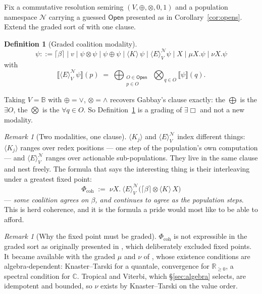 \documentclass[11pt,a4paper]{article}
\theoremstyle{plain}
\theoremstyle{definition}
\newtheorem{definition}[theorem]{Definition}
\theoremstyle{remark}
\newtheorem{remark}[theorem]{Remark}
\newcommand{\Open}{\mathsf{Open}}
\newcommand{\Ebox}{\exists\Box}
\newcommand{\gE}[2]{\langle E\rangle^{#1}_{#2}}
\newcommand{\gK}[1]{\langle K_{#1}\rangle}
\newcommand{\Nsp}{\mathcal{N}}
\newcommand{\Val}{V}
\newcommand{\sem}[1]{\llbracket #1 \rrbracket}
\begin{document}
Fix a commutative resolution semiring $(\Val,\oplus,\otimes,0,1)$ and a
population namespace $\Nsp$ carrying a guessed $\Open$ presented as in
Corollary~\ref{cor:opens}. Extend the graded sort of \cite{gradedwhere,choicef}
with one clause.

\begin{definition}[Graded coalition modality]\label{def:gE}
\[
\psi ::= \lceil\beta\rceil \mid v \mid \psi\otimes\psi \mid \psi\oplus\psi
      \mid \gK{}{}\,\psi \mid \gE{\Nsp}{\Val}\psi
      \mid X \mid \mu X.\psi \mid \nu X.\psi
\]
with
\[
\sem{\gE{\Nsp}{\Val}\psi}(p) \;=\;
\bigoplus_{\substack{O\in\Open\\ p\in O}}\ \bigotimes_{q\in O} \sem{\psi}(q).
\]
\end{definition}

Taking $\Val = \mathbb{B}$ with $\oplus = \vee$, $\otimes = \wedge$ recovers
Gabbay's clause exactly: the $\bigoplus$ is the $\exists O$, the $\bigotimes$
is the $\forall q\in O$. So Definition~\ref{def:gE} is a grading of $\Ebox$ and
not a new modality.

\begin{remark}[Two modalities, one clause]\label{rem:twomod}
$\gK{j}$ and $\gE{\Nsp}{\Val}$ index different things: $\gK{j}$ ranges over
redex positions --- one step of the population's own computation --- and
$\gE{\Nsp}{\Val}$ ranges over actionable sub-populations. They live in the same
clause and nest freely. The formula that says the interesting thing is their
interleaving under a greatest fixed point:
\[
\Phi_{\mathrm{coh}} \;:=\; \nu X.\ \gE{\Nsp}{\Val}\big(\lceil\beta\rceil
  \otimes \gK{}{}\,X\big)
\]
--- \emph{some coalition agrees on $\beta$, and continues to agree as the
population steps}. This is herd coherence, and it is the formula a pride would
most like to be able to afford.
\end{remark}

\begin{remark}[Why the fixed point must be graded]
$\Phi_{\mathrm{coh}}$ is not expressible in the graded sort as originally
presented in \cite{gradedwhere}, which deliberately excluded fixed points. It
became available with the graded $\mu$ and $\nu$ of \cite{choicef}, whose
existence conditions are algebra-dependent: Knaster--Tarski for a quantale,
convergence for $\mathbb{R}_{\ge0}$, a spectral condition for $\mathbb{C}$.
Tropical and Viterbi, which \S\ref{sec:algebra} selects, are idempotent
and bounded, so $\nu$ exists by Knaster--Tarski on the value order.
\end{remark}
\end{document}
